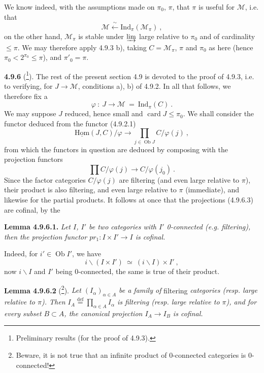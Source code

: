 \documentclass[11pt]{article}
\newcommand{\printedpage}[1]{\marginpar{\footnotesize p.~#1}}
\newcommand{\msp}[1]{\marginpar{\footnotesize [#1]}}
\newcommand{\uHom}{\underline{\mathrm{Hom}}}
\newcommand{\Ind}{\mathrm{Ind}}
\newcommand{\Ob}{\operatorname{Ob}}
\newcommand{\card}{\operatorname{card}}
\newcommand{\cM}{\mathcal{M}}
\begin{document}
\msp{page 221}We know indeed, with the assumptions made on $\pi_0$, $\pi$, that $\pi$ is useful for $\cM$, i.e. that
\[
\cM \xleftarrow{\ \sim\ } \Ind_\pi(\cM_\pi) \ ,
\]
on the other hand, $\cM_\pi$ is stable under $\varinjlim$ large relative to $\pi_0$ and of cardinality $\leqslant \pi$. We may therefore apply 4.9.3 b), taking $C = \cM_\pi$, $\pi$ and $\pi_0$ as here (hence $\pi_0 < 2^{\pi_0} \leqslant \pi$), and $\pi'_0 = \pi$.

\printedpage{80}

\textbf{4.9.6} (\footnote[96]{Preliminary results (for the proof of 4.9.3).}). The rest of the present section 4.9 is devoted to the proof of 4.9.3, i.e. to verifying, for $J \longrightarrow \cM$, conditions a), b) of 4.9.2. In all that follows, we therefore fix a
\[
\varphi \ : \ J \longrightarrow \cM \ = \ \Ind_\pi(C) \ . \tag*{(4.9.6.1)}
\]
We may suppose $J$ reduced, hence small and $\card J \leqslant \pi_0$. We shall consider the functor deduced from the functor (4.9.2.1)
\[
\uHom(J,C)/\varphi \longrightarrow \prod_{j \in \Ob J} C/\varphi(j) \ , \tag*{(4.9.6.2)}
\]
from which the functors in question are deduced by composing with the projection functors
\[
\prod C/\varphi(j) \longrightarrow C/\varphi(j_0) \ . \tag*{(4.9.6.3)}
\]
Since the factor categories $C/\varphi(j)$ are filtering (and even large relative to $\pi$), their product is also filtering, and even large relative to $\pi$ (immediate), and likewise
\msp{page 222}
for the partial products. It follows at once that the projections (4.9.6.3) are cofinal, by the

\textbf{Lemma 4.9.6.1.} \textit{Let $I$, $I'$ be two categories with $I'$ \textup{0}-connected (e.g. filtering), then the projection functor $pr_1 : I \times I' \longrightarrow I$ is cofinal.}

Indeed, for $i' \in \Ob I'$, we have
\[
i\backslash(I \times I') \ \simeq \ (i\backslash I) \times I' \ ,
\]
now $i\backslash I$ and $I'$ being 0-connected, the same is true of their product.

\textbf{Lemma 4.9.6.2} (\footnote[97]{Beware, it is not true that an infinite product of 0-connected categories is 0-connected!}). \textit{Let $(I_\alpha)_{\alpha \in A}$ be a family of} filtering \textit{categories (resp. large relative to $\pi$). Then $I_A \stackrel{\text{def}}{=} \prod_{\alpha \in A} I_\alpha$ is filtering (resp. large relative to $\pi$), and for every subset $B \subset A$, the canonical projection $I_A \longrightarrow I_B$ is cofinal.} %
\end{document}

